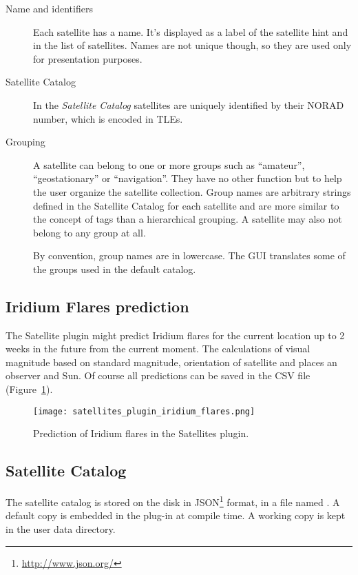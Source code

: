 \begin{description}
\item[Name and identifiers] Each satellite has a name. It's displayed as a label of the satellite hint and in the list of satellites. Names are not unique though, so they are used only
for presentation purposes.

\item[Satellite Catalog] In the \emph{Satellite Catalog} satellites are uniquely identified by their NORAD number, which is encoded in TLEs.

\item[Grouping]
A satellite can belong to one or more groups such as ``amateur'',
``geostationary'' or ``navigation''. They have no other function but
to help the user organize the satellite collection.  Group names are
arbitrary strings defined in the Satellite Catalog for each satellite
and are more similar to the concept of tags than a hierarchical
grouping. A satellite may also not belong to any group at all.

By convention, group names are in lowercase. The GUI translates some of the groups used in the default catalog.
\end{description}

\subsection{Iridium Flares prediction}
\label{sec:plugins:Satellites:IridiumFlares}

The Satellite plugin might predict Iridium flares for the current location up to 2 weeks in the future from the current moment. The calculations of visual magnitude based on standard magnitude, orientation of satellite and places an observer and Sun. Of course all predictions can be saved in the CSV file (Figure~\ref{fig:plugins:Satellites:IridiumFlares}).

\begin{figure}[htbp]
\centering\texttt{[image: satellites\_plugin\_iridium\_flares.png]}
\caption{Prediction of Iridium flares in the Satellites plugin.}
\label{fig:plugins:Satellites:IridiumFlares}
\end{figure}

\subsection{Satellite Catalog}
\label{sec:plugins:Satellites:catalog}

The satellite catalog is stored on the disk in JSON\footnote{\url{http://www.json.org/}}
format, in a file named . A default copy is embedded in the plug-in at compile time. A working copy is kept in the user data directory.

